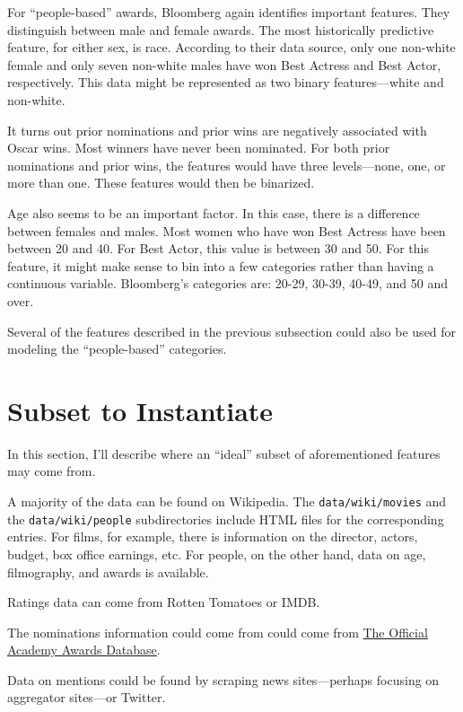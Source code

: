\documentclass[11pt]{article}
\begin{document}
For ``people-based'' awards, Bloomberg again identifies important features.
They distinguish between male and female awards. The most historically
predictive feature, for either sex, is race. According to their data source,
only one non-white female and only seven non-white males have won Best Actress
and Best Actor, respectively. This data might be represented as two binary
features---white and non-white.

It turns out prior nominations and prior wins are negatively associated with
Oscar wins. Most winners have never been nominated. For both prior nominations
and prior wins, the features would have three levels---none, one, or more than
one. These features would then be binarized.

Age also seems to be an important factor. In this case, there is a difference
between females and males. Most women who have won Best Actress have been
between 20 and 40. For Best Actor, this value is between 30 and 50. For this
feature, it might make sense to bin into a few categories rather than having a
continuous variable. Bloomberg's categories are: 20-29, 30-39, 40-49, and 50
and over.

Several of the features described in the previous subsection could also be used 
for modeling the ``people-based'' categories. 

\section{Subset to Instantiate}

In this section, I'll describe where an ``ideal'' subset of aforementioned
features may come from.

A majority of the data can be found on Wikipedia. The
\lstinline{data/wiki/movies} and the \lstinline{data/wiki/people}
subdirectories include HTML files for the corresponding entries. For films,
for example, there is information on the director, actors, budget, box office
earnings, etc. For people, on the other hand, data on age, filmography, and
awards is available.

Ratings data can come from Rotten Tomatoes or IMDB.

The nominations information could come from could come from
\href{http://awardsdatabase.oscars.org/ampas_awards/BasicSearchInput.jsp}{The
Official Academy Awards Database}.

Data on mentions could be found by scraping news sites---perhaps focusing on
aggregator sites---or Twitter.

 
\end{document}
